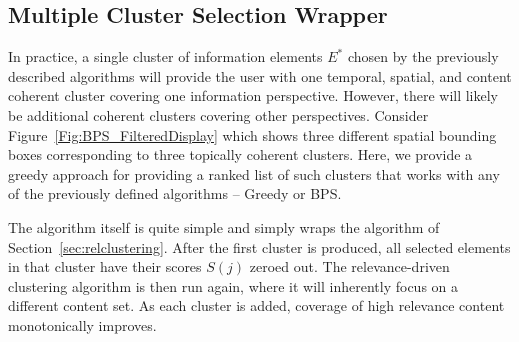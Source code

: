 
\subsection{Multiple Cluster Selection Wrapper}

In practice, a single cluster of information elements $E^*$ chosen by the previously described algorithms will provide the user with one temporal, spatial, and content coherent cluster covering one information perspective.  However, there will likely be additional coherent clusters covering other perspectives.  
Consider Figure~\ref{Fig:BPS_FilteredDisplay} which shows three different spatial bounding boxes corresponding to three topically coherent clusters.
Here, we provide a greedy approach for providing a ranked list of such clusters that works with any of the previously defined algorithms -- Greedy or BPS.%

The algorithm itself is quite simple and simply wraps the algorithm of Section~\ref{sec:relclustering}.  
After the first cluster is produced, all selected elements in that cluster have their scores $S(j)$ zeroed out.  The relevance-driven clustering algorithm is then run again, where it will inherently focus on a different content set.  As each cluster is added, coverage of high relevance content monotonically improves.










